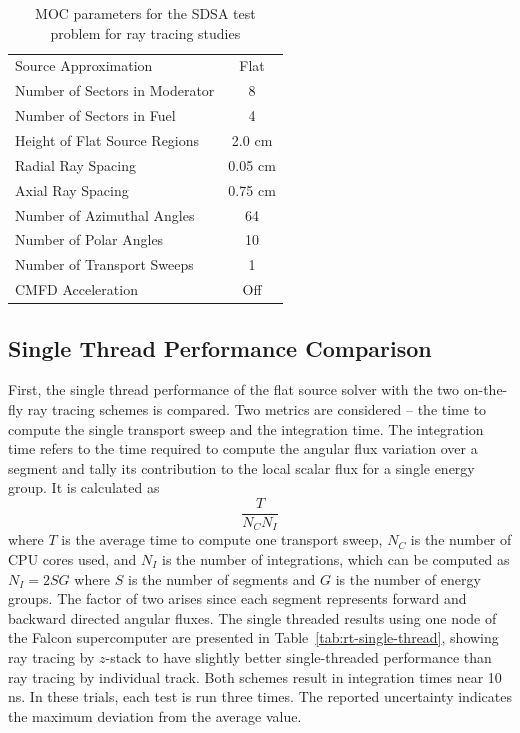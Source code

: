 \begin{table}[ht]
	\centering
	\caption{MOC parameters for the SDSA test problem for ray tracing studies}
	\medskip
	\begin{tabular}{lc}
		\hline
		Source Approximation & Flat \\
		Number of Sectors in Moderator & 8 \\
		Number of Sectors in Fuel & 4 \\
		Height of Flat Source Regions & 2.0 cm \\
		Radial Ray Spacing & 0.05 cm \\
		Axial Ray Spacing & 0.75 cm \\
		Number of Azimuthal Angles & 64 \\
		Number of Polar Angles & 10 \\
		Number of Transport Sweeps & 1 \\
		CMFD Acceleration & Off \\
		\hline
	\end{tabular}
	\label{tab:sdsa-rt-flat}
\end{table}

\subsection{Single Thread Performance Comparison}

First, the single thread performance of the flat source solver with the two on-the-fly ray tracing schemes is compared. Two metrics are considered -- the time to compute the single transport sweep and the integration time. The integration time refers to the time required to compute the angular flux variation over a segment and tally its contribution to the local scalar flux for a single energy group. It is calculated as 
\begin{equation*}
\frac{T}{N_C N_I}
\end{equation*}
where $T$ is the average time to compute one transport sweep, $N_C$ is the number of CPU cores used, and $N_I$ is the number of integrations, which can be computed as $N_I = 2 S G$ where $S$ is the number of segments and $G$ is the number of energy groups. The factor of two arises since each segment represents forward and backward directed angular fluxes. The single threaded results using one node of the Falcon supercomputer are presented in Table~\ref{tab:rt-single-thread}, showing ray tracing by $z$-stack to have slightly better single-threaded performance than ray tracing by individual track. Both schemes result in integration times near 10 ns. In these trials, each test is run three times. The reported uncertainty indicates the maximum deviation from the average value.

